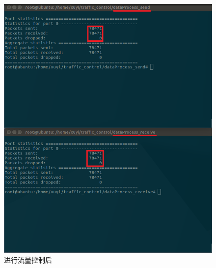 \documentclass{article}
\begin{document}
\begin{figure}[H]
	\centering
	\includegraphics[width = .8\textwidth]{traffic_result.png}
	\caption{进行流量控制后}
\end{figure}

\end{document}
